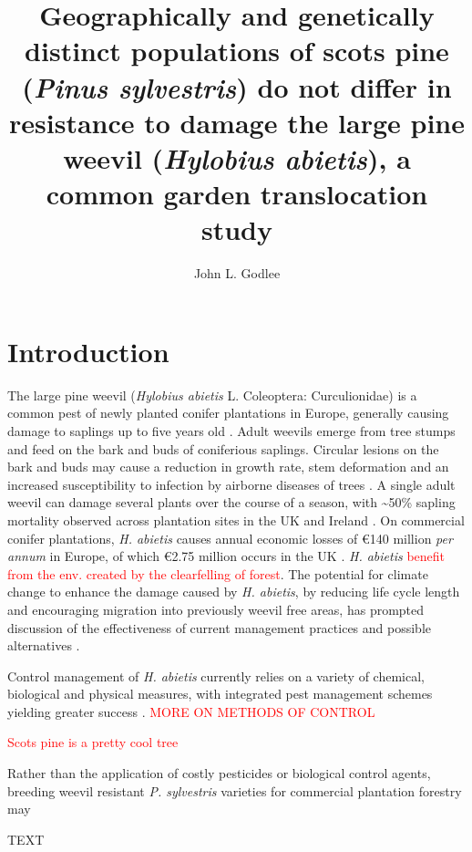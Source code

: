 \documentclass[a4paper, 11pt]{article}
\title{Geographically and genetically distinct populations of scots pine (\textit{Pinus sylvestris}) do not differ in resistance to damage the large pine weevil (\textit{Hylobius abietis}), a common garden translocation study}
\author{John L. Godlee}
\newcommand{\todo}[1]{\textcolor{red}{#1}}   %
\begin{document}

\maketitle{}

\begin{abstract}
\end{abstract}

\section*{Introduction}

The large pine weevil (\textit{Hylobius abietis} L. Coleoptera: Curculionidae) is a common pest of newly planted conifer plantations in Europe, generally causing damage to saplings up to five years old \citep{Dillon2008}. Adult weevils emerge from tree stumps and feed on the bark and buds of coniferious saplings. Circular lesions on the bark and buds may cause a reduction in growth rate, stem deformation and an increased susceptibility to infection by airborne diseases of trees \citep{Leather1999}. A single adult weevil can damage several plants over the course of a season, with \textasciitilde{}50\% sapling mortality observed across plantation sites in the UK and Ireland \citep{Heritage2001}. On commercial conifer plantations, \textit{H. abietis} causes annual economic losses of \euro{}140 million \textit{per annum} in Europe, of which \euro{}2.75 million occurs in the UK \citep{Evans2015}. \textit{H. abietis} \todo{benefit from the env. created by the clearfelling of forest}. The potential for climate change to enhance the damage caused by \textit{H. abietis}, by reducing life cycle length and encouraging migration into previously weevil free areas, has prompted discussion of the effectiveness of current management practices and possible alternatives \citep{}.

Control management of \textit{H. abietis} currently relies on a variety of chemical, biological and physical measures, with integrated pest management schemes yielding greater success \citep{}. \todo{MORE ON METHODS OF CONTROL}

\todo{Scots pine is a pretty cool tree}

Rather than the application of costly pesticides or biological control agents, breeding weevil resistant \textit{P. sylvestris} varieties for commercial plantation forestry may 


TEXT

\end{document}
